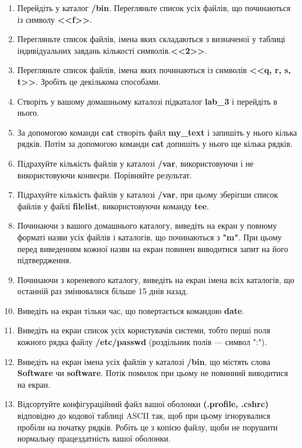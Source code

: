 \documentclass[a4paper,12pt]{article}
\begin{document}
    \begin{enumerate}
        \item Перейдіть у каталог \textbf{/bin}. Перегляньте список усіх файлів, що починаються із символу \textbf{<<f>>}.
        \item Перегляньте список файлів, імена яких складаються з визначеної у таблиці індивідуальних завдань кількості символів.\textbf{<<2>>}.
        \item Перегляньте список файлів, імена яких починаються із символів \textbf{<<q, r, s, t>>}. Зробіть це декількома способами.
        \item Створіть у вашому домашньому каталозі підкаталог \textbf{lab\_3} і перейдіть в нього.
        \item За допомогою команди \textbf{cat} створіть файл \textbf{my\_text} і запишіть у нього кілька рядків. Потім за допомогою команди \textbf{cat} 
        допишіть у нього ще кілька рядків.
        \item Підрахуйте кількість файлів у каталозі \textbf{/var}, використовуючи і не використовуючи конвеєри. Порівняйте результат.
        \item Підрахуйте кількість файлів у каталозі \textbf{/var}, при цьому зберігши список файлів у файлі \textbf{filelist}, використовуючи команду \textbf{tee}.
        \item Починаючи з вашого домашнього каталогу, виведіть на екран у повному форматі назви усіх файлів і каталогів, що починаються з \textbf{"m"}. 
        При цьому перед виведенням кожної назви на екран повинен виводитися запит на його підтвердження.
        \item Починаючи з кореневого каталогу, виведіть на екран імена всіх каталогів, що останній раз змінювалися більше 15 днів назад.
        \item Виведіть на екран тільки час, що повертається командою \textbf{date}.
        \item Виведіть на екран список усіх користувачів системи, тобто перші поля кожного рядка файлу \textbf{/etc/passwd} (роздільник полів — символ ":").
        \item Виведіть на екран імена усіх файлів у каталозі \textbf{/bin}, що містять слова \textbf{Software} чи \textbf{software}.
         Потік помилок при цьому не повинний виводитися на екран.
        \item Відсортуйте конфігураційний файл вашої оболонки \textbf{(.profile, .cshrc)} відповідно до кодової таблиці ASCII так, щоб при цьому 
        ігнорувалися пробіли на початку рядків. Робіть це з копією файлу, щоби не порушити нормальну працездатність вашої оболонки.
    \end{enumerate}
\end{document}
